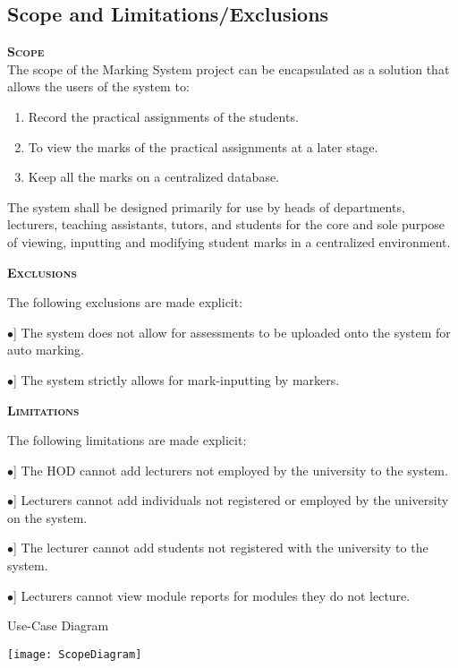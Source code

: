 \documentclass[12pt, a4paper]{scrartcl}
\newcommand{\tab}[1]{\hspace{.05\textwidth}\rlap{#1}}
\begin{document}
			\subsection{Scope and Limitations/Exclusions}
				\textsc{\bf Scope}\\
					The scope of the Marking System project can be encapsulated as a solution that allows the users of the system to:
					\begin{enumerate}
						\item Record the practical assignments of the students.
						\item To view the marks of the practical assignments at a later stage.
						\item Keep all the marks on a centralized database.
					\end{enumerate}
					The system shall be designed primarily for use by heads of departments, lecturers, teaching assistants, tutors, and students for the core and sole purpose of viewing, inputting and modifying student marks in a centralized environment.

				\textsc{\bf Exclusions}
					\begin{description}
						\item The following exclusions are made explicit:
						\begin{description}
							\item \tab [$\bullet$] The system does not allow for assessments to be uploaded onto the system for auto marking.
							\item \tab [$\bullet$] The system strictly allows for mark-inputting by markers.
						\end{description}
 					\end{description}
				\textsc{\bf Limitations}
					\begin{description}
						\item The following limitations are made explicit:
						\begin{description}	
							\item \tab [$\bullet$] The HOD cannot add lecturers not employed by the university to the system.	
							\item \tab [$\bullet$] Lecturers cannot add individuals not registered or employed by the university on the system.	
							\item \tab [$\bullet$] The lecturer cannot add students not registered with the university to the system.	
							\item \tab [$\bullet$] Lecturers cannot view module reports for modules they do not lecture.
						\end{description}					
						\item Use-Case Diagram
                		\item \texttt{[image: ScopeDiagram]}
                	\end{description}
\end{document}
